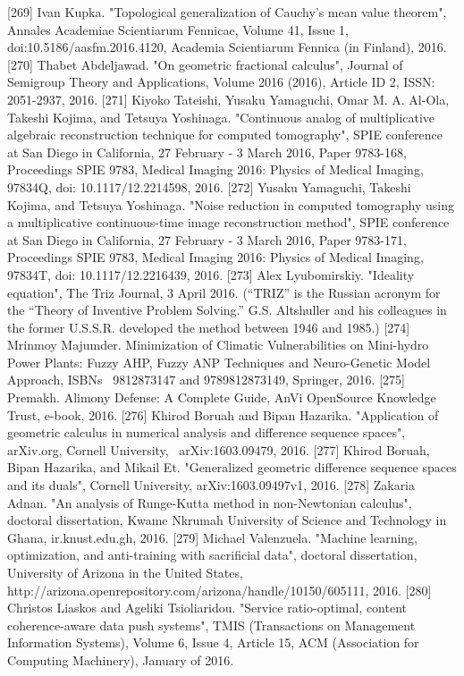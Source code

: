 \documentclass[12pt]{article}
\begin{document}
[269] Ivan Kupka. "Topological generalization of Cauchy's mean value theorem", Annales Academiae Scientiarum Fennicae, Volume 41, Issue 1, doi:10.5186/aasfm.2016.4120, Academia Scientiarum Fennica (in Finland), 2016.
[270] Thabet Abdeljawad. "On geometric fractional calculus", Journal of Semigroup Theory and Applications, Volume 2016 (2016), Article ID 2, ISSN: 2051-2937, 2016.
[271] Kiyoko Tateishi, Yusaku Yamaguchi, Omar M. A. Al-Ola, Takeshi Kojima, and Tetsuya Yoshinaga. "Continuous analog of multiplicative algebraic reconstruction technique for computed tomography", SPIE conference at San Diego in California, 27 February - 3 March 2016, Paper 9783-168, Proceedings SPIE 9783, Medical Imaging 2016: Physics of Medical Imaging, 97834Q, doi: 10.1117/12.2214598, 2016.
[272] Yusaku Yamaguchi, Takeshi Kojima, and Tetsuya Yoshinaga. "Noise reduction in computed tomography using a multiplicative continuous-time image reconstruction method", SPIE conference at San Diego in California, 27 February - 3 March 2016, Paper 9783-171, Proceedings SPIE 9783, Medical Imaging 2016: Physics of Medical Imaging, 97834T, doi: 10.1117/12.2216439, 2016. 
[273] Alex Lyubomirskiy. "Ideality equation", The Triz Journal, 3 April 2016. (“TRIZ” is the Russian acronym for the “Theory of Inventive Problem Solving.” G.S. Altshuller and his colleagues in the former U.S.S.R. developed the method between 1946 and 1985.)
[274] Mrinmoy Majumder. Minimization of Climatic Vulnerabilities on Mini-hydro Power Plants: Fuzzy AHP, Fuzzy ANP Techniques and Neuro-Genetic Model Approach, ISBNs  9812873147 and 9789812873149, Springer, 2016.
[275] Premakh. Alimony Defense: A Complete Guide, AnVi OpenSource Knowledge Trust, e-book, 2016.
[276] Khirod Boruah and Bipan Hazarika. "Application of geometric calculus in numerical analysis and difference sequence spaces", arXiv.org, Cornell University,  arXiv:1603.09479, 2016.
[277] Khirod Boruah, Bipan Hazarika, and Mikail Et. "Generalized geometric difference sequence spaces and its duals", Cornell University, arXiv:1603.09497v1, 2016.
[278] Zakaria Adnan. "An analysis of Runge-Kutta method in non-Newtonian calculus", doctoral dissertation, Kwame Nkrumah University of Science and Technology in Ghana, ir.knust.edu.gh, 2016.
[279] Michael Valenzuela. "Machine learning, optimization, and anti-training with sacrificial data", doctoral dissertation, University of Arizona in the United States, http://arizona.openrepository.com/arizona/handle/10150/605111, 2016.
[280] Christos Liaskos and Ageliki Tsioliaridou. "Service ratio-optimal, content coherence-aware data push systems", TMIS (Transactions on Management Information Systems), Volume 6, Issue 4, Article 15, ACM (Association for Computing Machinery), January of 2016.
\end{document}

